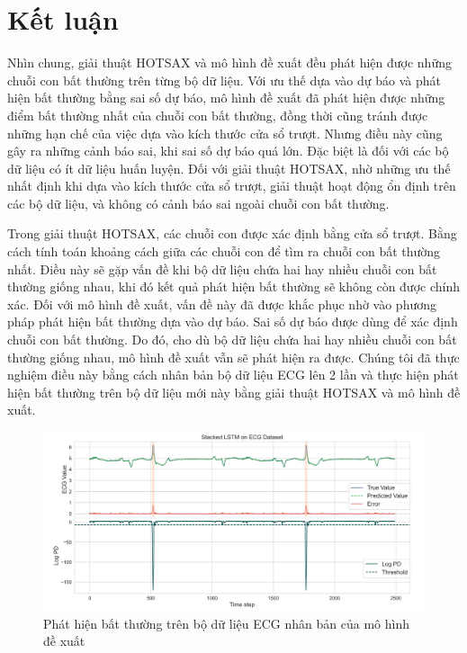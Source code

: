 \section{Kết luận}
Nhìn chung, giải thuật HOTSAX và mô hình đề xuất đều phát hiện được những chuỗi con bất thường trên từng bộ dữ liệu. Với ưu thế dựa vào dự báo và phát hiện bất thường bằng sai số dự báo, mô hình đề xuất đã phát hiện được những điểm bất thường nhất của chuỗi con bất thường, đồng thời cũng tránh được những hạn chế của việc dựa vào kích thước cửa sổ trượt. Nhưng điều này cũng gây ra những cảnh báo sai, khi sai số dự báo quá lớn. Đặc biệt là đối với các bộ dữ liệu có ít dữ liệu huấn luyện. Đối với giải thuật HOTSAX, nhờ những ưu thế nhất định khi dựa vào kích thước cửa sổ trượt, giải thuật hoạt động ổn định trên các bộ dữ liệu, và không có cảnh báo sai ngoài chuỗi con bất thường.

Trong giải thuật HOTSAX, các chuỗi con được xác định bằng cửa sổ trượt. Bằng cách tính toán khoảng cách giữa các chuỗi con để tìm ra chuỗi con bất thường nhất. Điều này sẽ gặp vấn đề khi bộ dữ liệu chứa hai hay nhiều chuỗi con bất thường giống nhau, khi đó kết quả phát hiện bất thường sẽ không còn được chính xác. Đối với mô hình đề xuất, vấn đề này đã được khắc phục nhờ vào phương pháp phát hiện bất thường dựa vào dự báo. Sai số dự báo được dùng để xác định chuỗi con bất thường. Do đó, cho dù bộ dữ liệu chứa hai hay nhiều chuỗi con bất thường giống nhau, mô hình đề xuất vẫn sẽ phát hiện ra được. Chúng tôi đã thực nghiệm điều này bằng cách nhân bản bộ dữ liệu ECG lên 2 lần và thực hiện phát hiện bất thường trên bộ dữ liệu mới này bằng giải thuật HOTSAX và mô hình đề xuất.

\begin{figure}[H]
    \centering
    \includegraphics[scale=0.4]{./content/images/5-19.png}
    \caption{Phát hiện bất thường trên bộ dữ liệu ECG nhân bản của mô hình đề xuất}
    \label{fig:5-19}
\end{figure}

